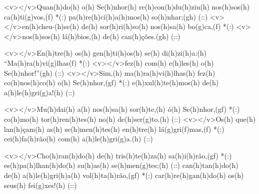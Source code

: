 <v></v>Quan(h)do(h) o(h) Se(h)nhor(h) re(h)con(h)du(h)ziu(h) nos(h)sos(h) ca(h)ti(g)vos,(f) *(:)
pa(h)re(h)cí(h)a(h)mos(h) so(h)nhar;(gh) (::)
<v></v>en(h)cheu-(h)se(h) de(h) sor(h)ri(h)so(h) nos(h)sa(h) bo(g)ca,(f) *(:)
<v></v>nos(h)sos(h) lá(h)bios,(h) de(h) can(h)ções.(gh) (::)

<v></v>En(h)tre(h) os(h) gen(h)ti(h)os(h) se(h) di(h)zi(h)a:(h) ``Ma(h)ra(h)vi(g)lhas(f) *(:)
<v></v>fez(h) com(h) e(h)les(h) o(h) Se(h)nhor!''(gh) (::)
<v></v>Sim,(h) ma(h)ra(h)vi(h)lhas(h) fez(h) co(h)nos(h)co(h) o(h) Se(h)nhor,(gf) *(:)
e(h)xul(h)te(h)mos(h) de(h) a(h)le(h)gri(g)a!(h) (::)

<v></v>Mu(h)dai(h) a(h) nos(h)sa(h) sor(h)te,(h) ó(h) Se(h)nhor,(gf) *(:)
co(h)mo(h) tor(h)ren(h)tes(h) no(h) de(h)ser(g)to.(h) (::)
<v></v>Os(h) que(h) lan(h)çam(h) as(h) se(h)men(h)tes(h) en(h)tre(h) lá(g)gri(f)mas,(f) *(:)
cei(h)fa(h)rão(h) com(h) a(h)le(h)gri(g)a.(h) (::)

<v></v>Cho(h)ran(h)do(h) de(h) tris(h)te(h)za(h) sa(h)i(h)rão,(gf) *(:)
es(h)pa(h)lhan(h)do(h) su(h)as(h) se(h)men(g)tes;(h) (::)
can(h)tan(h)do(h) de(h) a(h)le(h)gri(h)a(h) vol(h)ta(h)rão,(gf) *(:)
car(h)re(h)gan(h)do(h) os(h) seus(h) fei(g)xes!(h) (::)